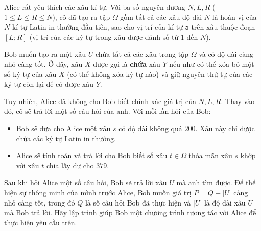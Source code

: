 Alice rất yêu thích các xâu kí tự. Với ba số nguyên dương $N, L, R$ ($1 \le L \le R \le N$), cô đã tạo ra tập $\Omega$ gồm tất cả các xâu độ dài $N$ là hoán vị của $N$ kí tự Latin in thường đầu tiên, sao cho vị trí của kí tự \texttt{a} trên xâu thuộc đoạn $[L; R]$ (vị trí của các ký tự trong xâu được đánh số từ $1$ đến $N$).

Bob muốn tạo ra một xâu $U$ chứa tất cả các xâu trong tập $\Omega$ và có độ dài càng nhỏ càng tốt. Ở đây, xâu $X$ được gọi là \textbf{chứa} xâu $Y$ nếu như có thể xóa bỏ một số ký tự của xâu $X$ (có thể không xóa ký tự nào) và giữ nguyên thứ tự của các ký tự còn lại để có được xâu $Y$.

Tuy nhiên, Alice đã không cho Bob biết chính xác giá trị của $N,L,R$. Thay vào đó, cô sẽ trả lời một số câu hỏi của anh. Với mỗi lần hỏi của Bob:
\begin{itemize}
   \item Bob sẽ đưa cho Alice một xâu $s$ có độ dài không quá $200$. Xâu này chỉ được chứa các ký tự Latin in thường.
   \item Alice sẽ tính toán và trả lời cho Bob biết số xâu $t\in \Omega$ thỏa mãn xâu $s$ khớp với xâu $t$ chia lấy dư cho $379$.
\end{itemize}

Sau khi hỏi Alice một số câu hỏi, Bob sẽ trả lời xâu $U$ mà anh tìm được. Để thể hiện sự thông minh của mình trước Alice, Bob muốn giá trị $P=Q+|U|$ càng nhỏ càng tốt, trong đó $Q$ là số câu hỏi Bob đã thực hiện và $|U|$ là độ dài xâu $U$ mà Bob trả lời. Hãy lập trình giúp Bob một chương trình tương tác với Alice để thực hiện yêu cầu trên.